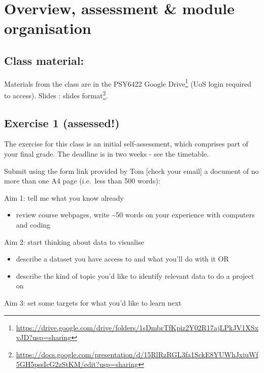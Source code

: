 \documentclass[
  12pt,
  a5paper,
]{book}
\DeclareRobustCommand{\href}[2]{#2\footnote{\url{#1}}}
\providecommand{\tightlist}{%
  \setlength{\itemsep}{0pt}\setlength{\parskip}{0pt}}
\begin{document}
\hypertarget{overview-assessment-module-organisation}{%
\chapter{Overview, assessment \& module organisation}\label{overview-assessment-module-organisation}}

\hypertarget{class-material}{%
\section{Class material:}\label{class-material}}

Materials from the class are in the PSY6422 \href{https://drive.google.com/drive/folders/1sDmbrTfKpiz2Y02R17ajLPkJV1XSxvJD?usp=sharing}{Google Drive} (UoS login required to access). Slides : \href{https://docs.google.com/presentation/d/15RlRzRGL3fa1SckE8YUWhJxiuWf5GH5pssIcG2zStKM/edit?usp=sharing}{slides format}.

\hypertarget{exercise-1-assessed}{%
\section{Exercise 1 (assessed!)}\label{exercise-1-assessed}}

The exercise for this class is an initial self-assessment, which comprises part of your final grade. The deadline is in two weeks - see the timetable.

Submit using the form link provided by Tom {[}check your email{]} a document of no more than one A4 page (i.e.~less than 500 words):

Aim 1: tell me what you know already

\begin{itemize}
\tightlist
\item
  review course webpages, write \textasciitilde50 words on your experience with computers and coding
\end{itemize}

Aim 2: start thinking about data to visualise

\begin{itemize}
\tightlist
\item
  describe a dataset you have access to and what you'll do with it OR\\
\item
  describe the kind of topic you'd like to identify relevant data to do a project on
\end{itemize}

Aim 3: set some targets for what you'd like to learn next
\end{document}
